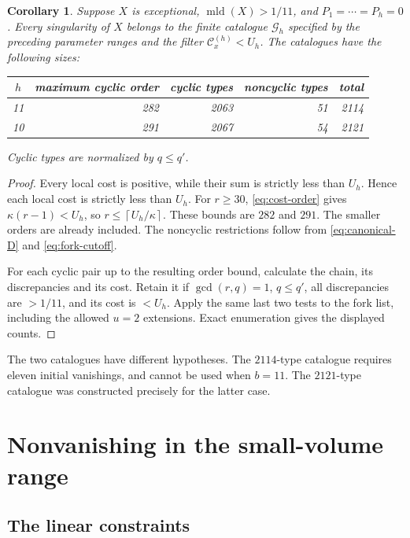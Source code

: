 \documentclass[12pt,a4paper]{article}
\numberwithin{equation}{section}
\newtheorem{corollary}[theorem]{Corollary}
\theoremstyle{definition}
\newcommand{\mld}{\operatorname{mld}}
\newcommand{\ceil}[1]{\left\lceil#1\right\rceil}
\newcommand{\cost}{\mathcal C}
\newcommand{\ccat}{\mathscr G}
\begin{document}
\begin{corollary}\label{cor:catalogues}
Suppose \(X\) is exceptional, \(\mld(X)>1/11\), and
\(P_1=\cdots=P_h=0\). Every singularity of \(X\) belongs to the
finite catalogue \(\ccat_h\) specified by the preceding parameter
ranges and the filter \(\cost_x^{(h)}<U_h\).
The catalogues have the following sizes:
\begin{center}
\begin{tabular}{c|rrrr}
\toprule
\(h\)&maximum cyclic order&cyclic types&noncyclic types&total\\
\midrule
11&282&2063&51&2114\\
10&291&2067&54&2121\\
\bottomrule
\end{tabular}
\end{center}
Cyclic types are normalized by \(q\leq q'\).
\end{corollary}

\begin{proof}
Every local cost is positive, while their sum is strictly less than
\(U_h\). Hence each local cost is strictly less than \(U_h\).
For \(r\geq30\), \eqref{eq:cost-order} gives
\(\kappa(r-1)<U_h\), so \(r\leq\ceil{U_h/\kappa}\).
These bounds are \(282\) and \(291\).
The smaller orders are already included.
The noncyclic restrictions follow from
\eqref{eq:canonical-D} and \eqref{eq:fork-cutoff}.

For each cyclic pair up to the resulting order bound, calculate the
chain, its discrepancies and its cost. Retain it if
\(\gcd(r,q)=1\), \(q\leq q'\), all discrepancies are \(>1/11\),
and its cost is \(<U_h\).
Apply the same last two tests to the fork list, including the allowed
\(u=2\) extensions. Exact enumeration gives the displayed counts.
\end{proof}

The two catalogues have different hypotheses. The \(2114\)-type
catalogue requires eleven initial vanishings, and cannot be used
when \(b=11\). The \(2121\)-type catalogue was constructed precisely
for the latter case.

\section{Nonvanishing in the small-volume range}\label{sec:nonvanishing}

\subsection{The linear constraints}
\end{document}
